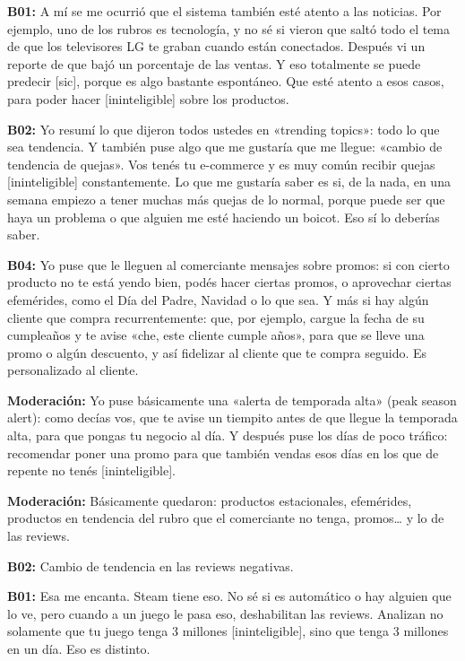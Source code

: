 \noindent\textbf{B01:} A mí se me ocurrió que el sistema también esté atento a las noticias. Por ejemplo, uno de los rubros es tecnología, y no sé si vieron que saltó todo el tema de que los televisores LG te graban cuando están conectados. Después vi un reporte de que bajó un porcentaje de las ventas. Y eso totalmente se puede predecir [sic], porque es algo bastante espontáneo. Que esté atento a esos casos, para poder hacer [ininteligible] sobre los productos.

\noindent\textbf{B02:} Yo resumí lo que dijeron todos ustedes en «trending topics»: todo lo que sea tendencia. Y también puse algo que me gustaría que me llegue: «cambio de tendencia de quejas». Vos tenés tu e-commerce y es muy común recibir quejas [ininteligible] constantemente. Lo que me gustaría saber es si, de la nada, en una semana empiezo a tener muchas más quejas de lo normal, porque puede ser que haya un problema o que alguien me esté haciendo un boicot. Eso sí lo deberías saber.

\noindent\textbf{B04:} Yo puse que le lleguen al comerciante mensajes sobre promos: si con cierto producto no te está yendo bien, podés hacer ciertas promos, o aprovechar ciertas efemérides, como el Día del Padre, Navidad o lo que sea. Y más si hay algún cliente que compra recurrentemente: que, por ejemplo, cargue la fecha de su cumpleaños y te avise «che, este cliente cumple años», para que se lleve una promo o algún descuento, y así fidelizar al cliente que te compra seguido. Es personalizado al cliente.

\noindent\textbf{Moderación:} Yo puse básicamente una «alerta de temporada alta» (peak season alert): como decías vos, que te avise un tiempito antes de que llegue la temporada alta, para que pongas tu negocio al día. Y después puse los días de poco tráfico: recomendar poner una promo para que también vendas esos días en los que de repente no tenés [ininteligible].

\noindent\textbf{Moderación:} Básicamente quedaron: productos estacionales, efemérides, productos en tendencia del rubro que el comerciante no tenga, promos… y lo de las reviews.

\noindent\textbf{B02:} Cambio de tendencia en las reviews negativas.

\noindent\textbf{B01:} Esa me encanta. Steam tiene eso. No sé si es automático o hay alguien que lo ve, pero cuando a un juego le pasa eso, deshabilitan las reviews. Analizan no solamente que tu juego tenga 3 millones [ininteligible], sino que tenga 3 millones en un día. Eso es distinto.

